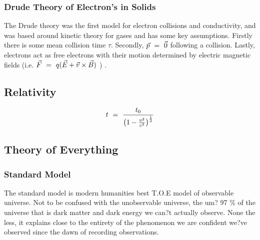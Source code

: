 \documentclass{article}
\begin{document}
\subsubsection{Drude Theory of Electron's in Solids}

The Drude theory was the first model for electron collisions and conductivity, and was based around kinetic theory for gases and has some key assumptions. Firstly there is some mean collision time \begin{math} \tau \end{math}. Secondly, \begin{math} \vec{p} \hspace{0.125cm} = \hspace{0.125cm} \vec{0} \end{math} following a collision. Lastly, electrons act as free electrons with their motion determined by electric magnetic fields (i.e. \begin{math} \vec{F} \hspace{0.125cm} = \hspace{0.125cm} q ( \vec{E} + \vec{v} \times \vec{B} ) \end{math} ) . 

\subsection{Relativity}

\begin{equation} \label{eq:101}
t \hspace{0.125cm} = \hspace{0.125cm} \frac{t_0}{\big(1 - \frac{v^{2}}{c^{2}} \big)^\frac{1}{2}}
\end{equation}

\subsection{Theory of Everything}
\subsubsection{Standard Model}
The standard model is modern humanities best T.O.E model of observable universe. Not to be confused with the unobservable universe, the um? 97 \% of the universe that is dark matter and dark energy we can?t actually observe. None the less, it explains close to the entirety of the phenomenon we are confident we?ve observed since the dawn of recording observations. \\
\end{document}

